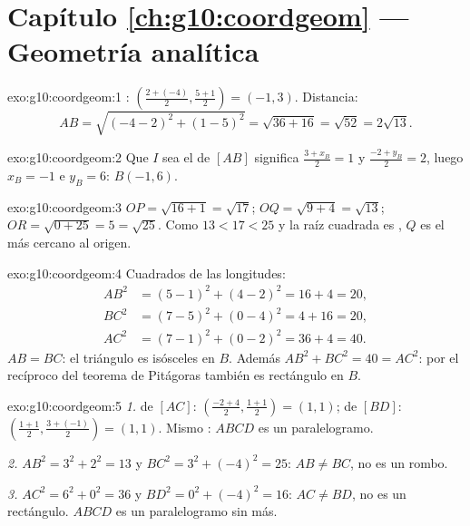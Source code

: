 \section*{Capítulo \ref{ch:g10:coordgeom} --- Geometría analítica}

\begin{solution}{exo:g10:coordgeom:1}
: $\left(\frac{2 + (-4)}{2}, \frac{5 + 1}{2}\right) = (-1, 3)$.
Distancia:
\[
AB = \sqrt{(-4 - 2)^2 + (1 - 5)^2} = \sqrt{36 + 16} = \sqrt{52}
= 2\sqrt{13}.
\]
\end{solution}

\begin{solution}{exo:g10:coordgeom:2}
Que $I$ sea el  de $[AB]$ significa $\frac{3 + x_B}{2} = 1$ y
$\frac{-2 + y_B}{2} = 2$, luego $x_B = -1$ e $y_B = 6$: $B(-1, 6)$.
\end{solution}

\begin{solution}{exo:g10:coordgeom:3}
$OP = \sqrt{16 + 1} = \sqrt{17}$; $OQ = \sqrt{9 + 4} = \sqrt{13}$;
$OR = \sqrt{0 + 25} = 5 = \sqrt{25}$. Como $13 < 17 < 25$ y la raíz
cuadrada es , $Q$ es el más cercano al origen.
\end{solution}

\begin{solution}{exo:g10:coordgeom:4}
Cuadrados de las longitudes:
\begin{align*}
AB^2 &= (5-1)^2 + (4-2)^2 = 16 + 4 = 20, \\
BC^2 &= (7-5)^2 + (0-4)^2 = 4 + 16 = 20, \\
AC^2 &= (7-1)^2 + (0-2)^2 = 36 + 4 = 40 .
\end{align*}
$AB = BC$: el triángulo es isósceles en $B$. Además
$AB^2 + BC^2 = 40 = AC^2$: por el recíproco del teorema de Pitágoras
también es rectángulo en $B$.
\end{solution}

\begin{solution}{exo:g10:coordgeom:5}
\emph{1.}  de $[AC]$:
$\left(\frac{-2+4}{2}, \frac{1+1}{2}\right) = (1, 1)$;  de
$[BD]$: $\left(\frac{1+1}{2}, \frac{3+(-1)}{2}\right) = (1, 1)$. Mismo
: $ABCD$ es un paralelogramo.

\emph{2.} $AB^2 = 3^2 + 2^2 = 13$ y $BC^2 = 3^2 + (-4)^2 = 25$:
$AB \neq BC$, no es un rombo.

\emph{3.} $AC^2 = 6^2 + 0^2 = 36$ y $BD^2 = 0^2 + (-4)^2 = 16$:
$AC \neq BD$, no es un rectángulo. $ABCD$ es un paralelogramo sin más.
\end{solution}

